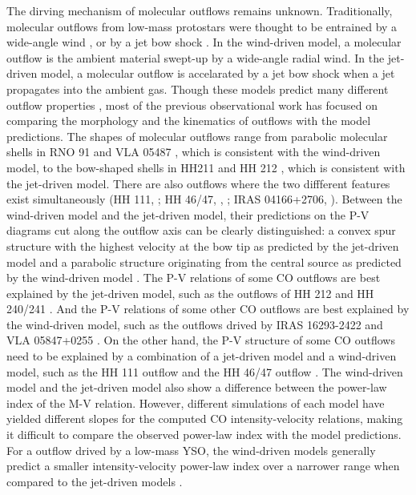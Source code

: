 The dirving mechanism of molecular outflows remains unknown. Traditionally, molecular outflows from low-mass protostars were thought to be entrained by a wide-angle wind \citep{1991ApJ...370L..31S, 2001ApJ...557..429L}, or by a jet bow shock \citep{ 1993A&A...278..267R, 1993ApJ...414..230M, 2001ApJ...557..429L}. In the wind-driven model, a molecular outflow is the ambient material swept-up by a wide-angle radial wind. In the jet-driven model, a molecular outflow is accelarated by a jet bow shock when a jet propagates into the ambient gas. Though these models predict many different outflow properties \citep{2007prpl.conf..245A}, most of the previous observational work has focused on comparing the morphology and the kinematics of outflows with the model predictions. The shapes of molecular outflows range from parabolic molecular shells in RNO 91 and VLA 05487 \citep{2000ApJ...542..925L}, which is consistent with the wind-driven model, to the bow-shaped shells in HH211 \citep{1999A&A...343..571G} and HH 212 \citep{2000ApJ...542..925L, 2015ApJ...805..186L}, which is consistent with the jet-driven model. There are also outflows where the two diffferent features exist simultaneously (HH 111, \citet{2000ApJ...542..925L}; HH 46/47, \citet{2013ApJ...774...39A}, \citet{2016ApJ...832..158Z}; IRAS 04166+2706, \citet{2009A&A...495..169S}).
Between the wind-driven model and the jet-driven model, their predictions on the P-V diagrams cut along the outflow axis can be clearly distinguished: a convex spur structure with the highest velocity at the bow tip as predicted by the jet-driven model and a parabolic structure originating from the central source as predicted by the wind-driven model \citep{2001ApJ...557..429L}. The P-V relations of some CO outflows are best explained by the jet-driven model, such as the outflows of HH 212 and HH 240/241 \citep{2000ApJ...542..925L}. And the P-V relations of some other CO outflows are best explained by the wind-driven model, such as the outflows drived by IRAS 16293-2422 \citep{2008ApJ...675..454Y} and VLA 05847+0255 \citep{2000ApJ...542..925L}. On the other hand, the P-V structure of some CO outflows need to be explained by a combination of a jet-driven model and a wind-driven model, such as the HH 111 outflow \citep{2000ApJ...542..925L} and the HH 46/47 outflow \citep{2013ApJ...774...39A}. The wind-driven model and the jet-driven model also show a difference between the power-law index of the M-V relation. However, different simulations of each model have yielded different slopes for the computed CO intensity-velocity relations, making it difficult to compare the observed power-law index with the model predictions. For a outflow drived by a low-mass YSO, the wind-driven models generally predict a smaller intensity-velocity power-law index over a narrower range when compared to the jet-driven models \citep{2007prpl.conf..245A}. 

